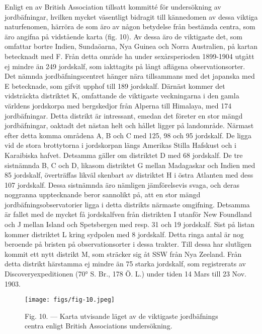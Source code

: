 \documentclass[a4paper, 12pt, oneside, swedish]{article}
\begin{document}
Enligt en av British Association tillsatt kommitté för undersökning av jordbäfningar, hvilken mycket väsentligt bidragit till kännedomen av dessa viktiga naturfenomen, härröra de som äro av någon betydelse från bestämda centra, som äro angifna på vidstående karta (fig. 10). Av dessa äro de viktigaste det, som omfattar bortre Indien, Sundaöarna, Nya Guinea och Norra Australien, på kartan betecknadt med F. Från detta område ha under sexårsperioden 1899-1904 utgått ej mindre än 249 jordskalf, som iakttagits på långt aflägsna observationsorter. Det nämnda jordbäfningscentret hänger nära tillsammans med det japanska med E betecknade, som gifvit upphof till 189 jordskalf. Därnäst kommer det vidsträckta distriktet K, omfattande de viktigaste veckningarna i den gamla världens jordskorpa med bergskedjor från Alperna till Himalaya, med 174 jordbäfningar. Detta distrikt är intressant, emedan det företer en stor mängd jordbäfningar, oaktadt det nästan helt och hållet ligger på landområde. Närmast efter detta komma områdena A, B och C med 125, 98 och 95 jordskalf. De ligga vid de stora brottytorna i jordskorpan längs Amerikas Stilla Hafskust och i Karaibiska hafvet. Detsamma gäller om distriktet D med 68 jordskalf. De tre sistnämnda B, C och D, likasom distriktet G mellan Madagaskar och Indien med 85 jordskalf, överträffas likväl skenbart av distriktet H i östra Atlanten med dess 107 jordskalf. Dessa sistnämnda äro nämligen jämförelsevis svaga, och deras noggranna upptecknande beror sannolikt på, att en stor mängd jordbäfningsobservatorier ligga i detta distrikts närmaste omgifning. Detsamma är fallet med de mycket få jordskalfven från distrikten I utanför New Foundland och J mellan Island och Spetsbergen med resp. 31 och 19 jordskalf. Sist på listan kommer distriktet L kring sydpolen med 8 jordskalf. Detta ringa antal är nog beroende på bristen på observationsorter i dessa trakter. Till dessa har slutligen kommit ett nytt distrikt M, som sträcker sig åt SSW från Nya Zeeland. Från detta distrikt härstamma ej mindre än 75 starka jordskalf, som registrerats av Discoveryexpeditionen (70° S. Br., 178 Ö. L.) under tiden 14 Mars till 23 Nov. 1903.

\begin{figure}[H]
\centering
\texttt{[image: figs/fig-10.jpeg]}
\caption{Fig. 10. --- Karta utvisande läget av de viktigaste jordbäfnings centra enligt British Associations undersökning.}
\end{figure}
\end{document}
